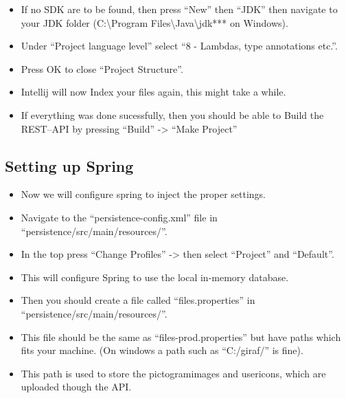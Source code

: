 \begin{itemize}
    \item If no SDK are to be found, then press ``New'' then ``JDK'' then navigate to your JDK folder (C:\textbackslash Program Files\textbackslash Java\textbackslash jdk*** on Windows).
    \item Under ``Project language level'' select ``8 - Lambdas, type annotations etc.''.
    \item Press OK to close ``Project Structure''.
    \item Intellij will now Index your files again, this might take a while.
    \item If everything was done sucessfully, then you should be able to Build the REST--API by pressing ``Build'' -> ``Make Project''
\end{itemize}

\subsection*{Setting up Spring}
\begin{itemize}
    \item Now we will configure spring to inject the proper settings.
    \item Navigate to the ``persistence-config.xml'' file in ``persistence/src/main/resources/''.
    \item In the top press ``Change Profiles'' -> then select ``Project'' and ``Default''.
    \item This will configure Spring to use the local in-memory database.
    \item Then you should create a file called ``files.properties'' in ``persistence/src/main/resources/''.
    \item This file should be the same as ``files-prod.properties'' but have paths which fits your machine. (On windows a path such as ``C:/giraf/''
is fine).
    \item This path is used to store the pictogramimages and usericons, which are uploaded though the API.
\end{itemize}

